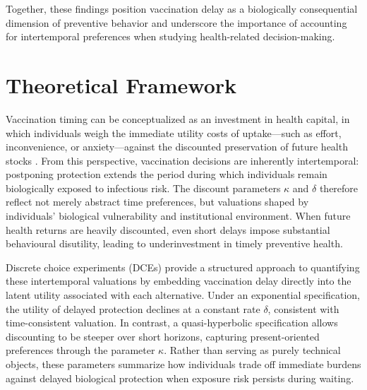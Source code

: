 \documentclass[preprint,12pt]{elsarticle}
\begin{document}
Together, these findings position vaccination delay as a biologically consequential dimension of preventive behavior and underscore the importance of accounting for intertemporal preferences when studying health-related decision-making. 


\section{Theoretical Framework}

Vaccination timing can be conceptualized as an investment in health capital,
in which individuals weigh the immediate utility costs of uptake—such as
effort, inconvenience, or anxiety—against the discounted preservation of
future health stocks \cite{Frederick2002}. From this perspective, vaccination
decisions are inherently intertemporal: postponing protection extends the
period during which individuals remain biologically exposed to infectious
risk. The discount parameters $\kappa$ and $\delta$ therefore reflect not
merely abstract time preferences, but valuations shaped by individuals’
biological vulnerability and institutional environment. When future health
returns are heavily discounted, even short delays impose substantial
behavioural disutility, leading to underinvestment in timely preventive
health.

Discrete choice experiments (DCEs) provide a structured approach to
quantifying these intertemporal valuations by embedding vaccination delay
directly into the latent utility associated with each alternative. Under an
exponential specification, the utility of delayed protection declines at a
constant rate $\delta$, consistent with time-consistent valuation. In
contrast, a quasi-hyperbolic specification allows discounting to be steeper
over short horizons, capturing present-oriented preferences through the
parameter $\kappa$. Rather than serving as purely technical objects, these
parameters summarize how individuals trade off immediate burdens against
delayed biological protection when exposure risk persists during waiting.
\end{document}
